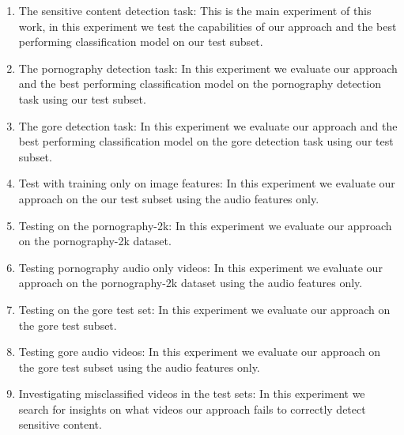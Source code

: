 \begin{enumerate}[start=0,label={(\bfseries E\arabic*):}]
\item The sensitive content detection task: This is the main experiment of this work, in this experiment we test the capabilities of our approach and the best performing classification model on our test subset.%

\item The pornography detection task: In this experiment we evaluate our approach and the best performing classification model on the pornography detection task using our test subset.

\item The gore detection task: In this experiment we evaluate our approach and the best performing classification model on the gore detection task using our test subset.

\item Test with training only on image features: In this experiment we evaluate our approach on the our test subset using the audio features only.

\item Testing on the pornography-2k:  In this experiment we evaluate our approach on the pornography-2k dataset.

\item Testing pornography audio only videos: In this experiment we evaluate our approach on the pornography-2k dataset using the audio features only.

\item Testing on the gore test set: In this experiment we evaluate our approach on the gore test subset.

\item Testing gore audio videos: In this experiment we evaluate our approach on the gore test subset using the audio features only.
\item Investigating misclassified videos in the test sets: In this experiment we search for insights on what videos our approach fails to correctly detect sensitive content.
\end{enumerate}

